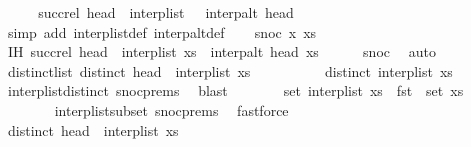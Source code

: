 \begin{isabellebody}
\ \ \isamarkupfalse%
\ \isamarkupfalse%
\ {\isachardoublequoteopen}succ{\isacharunderscore}rel\ {\isacharparenleft}head\ {\isacharhash}\ interp{\isacharunderscore}list\ {\isacharbrackleft}{\isacharbrackright}{\isacharparenright}\ {\isacharequal}\ interp{\isacharunderscore}alt\ head\ {\isacharbrackleft}{\isacharbrackright}{\isachardoublequoteclose}\isanewline
\ \ \ \ \isamarkupfalse%
\ {\isacharparenleft}simp\ add{\isacharcolon}\ interp{\isacharunderscore}list{\isacharunderscore}def\ interp{\isacharunderscore}alt{\isacharunderscore}def{\isacharparenright}\isanewline
{}\isamarkupfalse%
\isanewline
\ \ \isamarkupfalse%
\ {\isacharparenleft}snoc\ x\ xs{\isacharparenright}\isanewline
\ \ \isamarkupfalse%
\ IH{\isacharcolon}\ {\isachardoublequoteopen}succ{\isacharunderscore}rel\ {\isacharparenleft}head\ {\isacharhash}\ interp{\isacharunderscore}list\ xs{\isacharparenright}\ {\isacharequal}\ interp{\isacharunderscore}alt\ head\ xs{\isachardoublequoteclose}\isanewline
\ \ \ \ \isamarkupfalse%
\ snoc\ \isamarkupfalse%
\ auto\isanewline
\ \ \isamarkupfalse%
\ distinct{\isacharunderscore}list{\isacharcolon}\ {\isachardoublequoteopen}distinct\ {\isacharparenleft}head\ {\isacharhash}\ interp{\isacharunderscore}list\ xs{\isacharparenright}{\isachardoublequoteclose}\isanewline
\ \ \isamarkupfalse%
\ {\isacharminus}\isanewline
\ \ \ \ \isamarkupfalse%
\ {\isachardoublequoteopen}distinct\ {\isacharparenleft}interp{\isacharunderscore}list\ xs{\isacharparenright}{\isachardoublequoteclose}\isanewline
\ \ \ \ \ \ \isamarkupfalse%
\ interp{\isacharunderscore}list{\isacharunderscore}distinct\ snoc{\isachardot}prems{\isacharparenleft}{}{\isacharparenright}\ \isamarkupfalse%
\ blast\isanewline
\ \ \ \ \isamarkupfalse%
\ \isamarkupfalse%
\ {\isachardoublequoteopen}set\ {\isacharparenleft}interp{\isacharunderscore}list\ xs{\isacharparenright}\ {\isasymsubseteq}\ fst\ {\isacharbackquote}\ set\ xs{\isachardoublequoteclose}\isanewline
\ \ \ \ \ \ \isamarkupfalse%
\ interp{\isacharunderscore}list{\isacharunderscore}subset\ snoc{\isachardot}prems{\isacharparenleft}{}{\isacharparenright}\ \isamarkupfalse%
\ fastforce\isanewline
\ \ \ \ \isamarkupfalse%
\ \isamarkupfalse%
\ {\isachardoublequoteopen}distinct\ {\isacharparenleft}head\ {\isacharhash}\ interp{\isacharunderscore}list\ xs{\isacharparenright}{\isachardoublequoteclose}\isanewline

\end{isabellebody}
